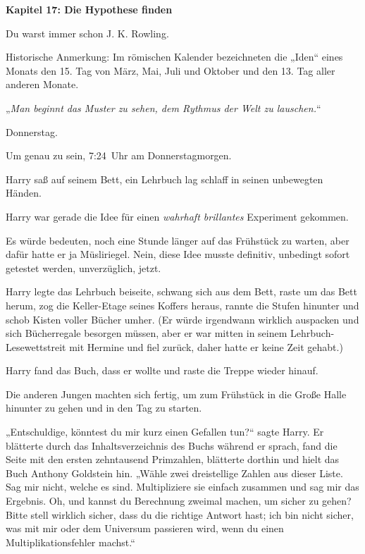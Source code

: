 

\hypertarget{die-hypothese-finden}{%

\textbf{Kapitel 17: Die Hypothese finden}

Du warst immer schon J. K. Rowling.

Historische Anmerkung: Im römischen Kalender bezeichneten die „Iden“ eines Monats den 15. Tag von März, Mai, Juli und Oktober und den 13. Tag aller anderen Monate.

\later

„\emph{Man beginnt das Muster zu sehen, dem Rythmus der Welt zu lauschen.}“

\later

Donnerstag.

Um genau zu sein, 7:24~Uhr am Donnerstagmorgen.

Harry saß auf seinem Bett, ein Lehrbuch lag schlaff in seinen unbewegten Händen.

Harry war gerade die Idee für einen \emph{wahrhaft brillantes} Experiment gekommen.

Es würde bedeuten, noch eine Stunde länger auf das Frühstück zu warten, aber dafür hatte er ja Müsliriegel. Nein, diese Idee musste definitiv, unbedingt sofort getestet werden, unverzüglich, jetzt.

Harry legte das Lehrbuch beiseite, schwang sich aus dem Bett, raste um das Bett herum, zog die Keller-Etage seines Koffers heraus, rannte die Stufen hinunter und schob Kisten voller Bücher umher. (Er würde irgendwann wirklich auspacken und sich Bücherregale besorgen müssen, aber er war mitten in seinem Lehrbuch-Lesewettstreit mit Hermine und fiel zurück, daher hatte er keine Zeit gehabt.)

Harry fand das Buch, dass er wollte und raste die Treppe wieder hinauf.

Die anderen Jungen machten sich fertig, um zum Frühstück in die Große Halle hinunter zu gehen und in den Tag zu starten.

„Entschuldige, könntest du mir kurz einen Gefallen tun?“ sagte Harry. Er blätterte durch das Inhaltsverzeichnis des Buchs während er sprach, fand die Seite mit den ersten zehntausend Primzahlen, blätterte dorthin und hielt das Buch Anthony Goldstein hin. „Wähle zwei dreistellige Zahlen aus dieser Liste. Sag mir nicht, welche es sind. Multipliziere sie einfach zusammen und sag mir das Ergebnis. Oh, und kannst du Berechnung zweimal machen, um sicher zu gehen? Bitte stell wirklich sicher, dass du die richtige Antwort hast; ich bin nicht sicher, was mit mir oder dem Universum passieren wird, wenn du einen Multiplikationsfehler machst.“

}

